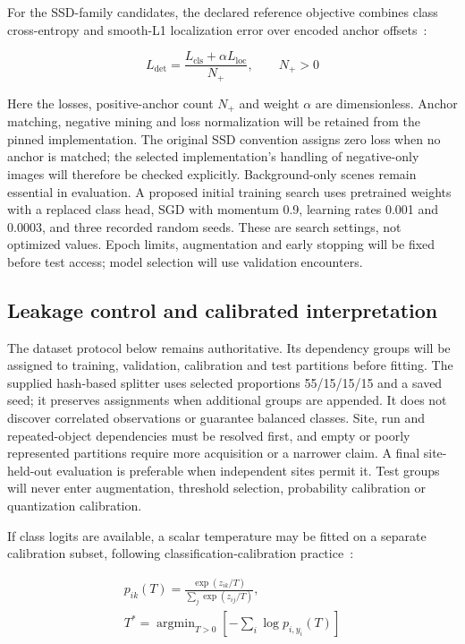 \documentclass[11pt,letterpaper]{article}
\begin{document}
For the SSD-family candidates, the declared reference objective combines class cross-entropy and smooth-L1 localization error over encoded anchor offsets~\cite{ENG_SSD}:

\begin{equation}
L_{\mathrm{det}}=\frac{L_{\mathrm{cls}}+\alpha L_{\mathrm{loc}}}{N_+},\qquad N_+>0
\label{eq:22}
\end{equation}

Here the losses, positive-anchor count \(N_+\) and weight \(\alpha\) are dimensionless. Anchor matching, negative mining and loss normalization will be retained from the pinned implementation. The original SSD convention assigns zero loss when no anchor is matched; the selected implementation's handling of negative-only images will therefore be checked explicitly. Background-only scenes remain essential in evaluation. A proposed initial training search uses pretrained weights with a replaced class head, SGD with momentum 0.9, learning rates 0.001 and 0.0003, and three recorded random seeds. These are search settings, not optimized values. Epoch limits, augmentation and early stopping will be fixed before test access; model selection will use validation encounters.

\subsection{Leakage control and calibrated interpretation}

The dataset protocol below remains authoritative. Its dependency groups will be assigned to training, validation, calibration and test partitions before fitting. The supplied hash-based splitter uses selected proportions 55/15/15/15 and a saved seed; it preserves assignments when additional groups are appended. It does not discover correlated observations or guarantee balanced classes. Site, run and repeated-object dependencies must be resolved first, and empty or poorly represented partitions require more acquisition or a narrower claim. A final site-held-out evaluation is preferable when independent sites permit it. Test groups will never enter augmentation, threshold selection, probability calibration or quantization calibration.

If class logits are available, a scalar temperature may be fitted on a separate calibration subset, following classification-calibration practice~\cite{ENG_TEMPERATURECAL}:

\begin{equation}
\begin{gathered}p_{ik}(T)=\frac{\exp(z_{ik}/T)}{\sum_j\exp(z_{ij}/T)},\\
T^*=\operatorname{argmin}_{T>0}\left[-\sum_i\log p_{i,y_i}(T)\right]\end{gathered}
\label{eq:23}
\end{equation}
\end{document}
